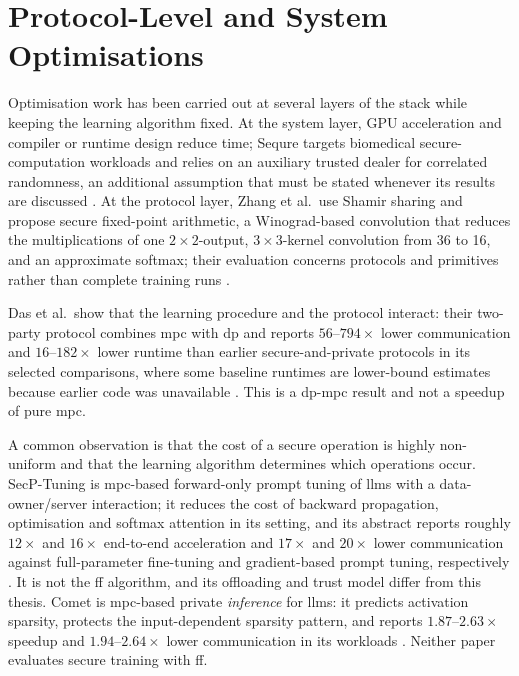 \section{Protocol-Level and System Optimisations}\label{sec:lr-opt}
Optimisation work has been carried out at several layers of the stack while keeping the learning algorithm fixed. At the system layer, GPU acceleration \cite{tan2021cryptgpu} and compiler or runtime design \cite{smajlovic2023sequre} reduce time; Sequre targets biomedical secure-computation workloads and relies on an auxiliary trusted dealer for correlated randomness, an additional assumption that must be stated whenever its results are discussed \cite{smajlovic2023sequre}. At the protocol layer, Zhang et al.\ use Shamir sharing and propose secure fixed-point arithmetic, a Winograd-based convolution that reduces the multiplications of one $2\times2$-output, $3\times3$-kernel convolution from 36 to 16, and an approximate softmax; their evaluation concerns protocols and primitives rather than complete training runs \cite{zhang2025efficient}.

Das et al.\ show that the learning procedure and the protocol interact: their two-party protocol combines \ac{mpc} with \ac{dp} and reports $56$--$794\times$ lower communication and $16$--$182\times$ lower runtime than earlier secure-and-private protocols in its selected comparisons, where some baseline runtimes are lower-bound estimates because earlier code was unavailable \cite{das2025dpmpc}. This is a \ac{dp}-\ac{mpc} result and not a speedup of pure \ac{mpc}.

A common observation is that the cost of a secure operation is highly non-uniform and that the learning algorithm determines which operations occur. SecP-Tuning is \ac{mpc}-based forward-only prompt tuning of \acp{llm} with a data-owner/server interaction; it reduces the cost of backward propagation, optimisation and softmax attention in its setting, and its abstract reports roughly $12\times$ and $16\times$ end-to-end acceleration and $17\times$ and $20\times$ lower communication against full-parameter fine-tuning and gradient-based prompt tuning, respectively \cite{luo2026secptuning}. It is not the \ac{ff} algorithm, and its offloading and trust model differ from this thesis. Comet is \ac{mpc}-based private \emph{inference} for \acp{llm}: it predicts activation sparsity, protects the input-dependent sparsity pattern, and reports $1.87$--$2.63\times$ speedup and $1.94$--$2.64\times$ lower communication in its workloads \cite{yan2025comet}. Neither paper evaluates secure training with \ac{ff}.

